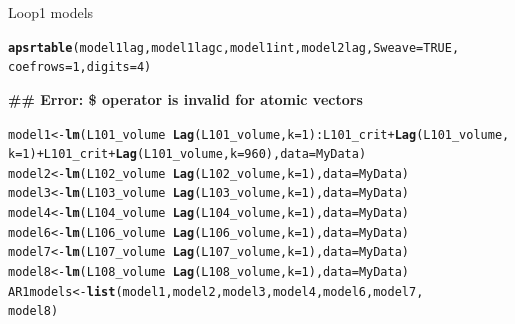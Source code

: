 \documentclass[review, authoryear]{elsarticle}\usepackage{graphicx, color}
\makeatletter
\newcommand{\hlfunctioncall}[1]{\textcolor[rgb]{0.501960784313725,0,0.329411764705882}{\textbf{#1}}}%
\newenvironment{kframe}{%
 \def\at@end@of@kframe{}%
 \ifinner\ifhmode%
  \def\at@end@of@kframe{\end{minipage}}%
  \begin{minipage}{\columnwidth}%
 \fi\fi%
 \def\FrameCommand##1{\hskip\@totalleftmargin \hskip-\fboxsep
 \colorbox{shadecolor}{##1}\hskip-\fboxsep
     \hskip-\linewidth \hskip-\@totalleftmargin \hskip\columnwidth}%
 \MakeFramed {\advance\hsize-\width
   \@totalleftmargin\z@ \linewidth\hsize
   \@setminipage}}%
 {\par\unskip\endMakeFramed%
 \at@end@of@kframe}
\newenvironment{knitrout}{}{} %
\makeatother
\begin{document}
\begin{table}
  \caption{Loop1 models}
\begin{knitrout}
\color{fgcolor}\begin{kframe}
\begin{alltt}
\hlfunctioncall{apsrtable}(model1lag, model1lagc, model1int, model2lag, Sweave = TRUE, 
    coefrows = 1, digits = 4)
\end{alltt}


{\ttfamily\noindent\bfseries\textcolor{errorcolor}{\#\# Error: \$ operator is invalid for atomic vectors}}\end{kframe}
\end{knitrout}

\end{table}

\begin{knitrout}
\color{fgcolor}\begin{kframe}
\begin{alltt}
model1 <- \hlfunctioncall{lm}(L101_volume ~ \hlfunctioncall{Lag}(L101_volume, k = 1):L101_crit + \hlfunctioncall{Lag}(L101_volume, 
    k = 1) + L101_crit + \hlfunctioncall{Lag}(L101_volume, k = 960), data = MyData)
model2 <- \hlfunctioncall{lm}(L102_volume ~ \hlfunctioncall{Lag}(L102_volume, k = 1), data = MyData)
model3 <- \hlfunctioncall{lm}(L103_volume ~ \hlfunctioncall{Lag}(L103_volume, k = 1), data = MyData)
model4 <- \hlfunctioncall{lm}(L104_volume ~ \hlfunctioncall{Lag}(L104_volume, k = 1), data = MyData)
model6 <- \hlfunctioncall{lm}(L106_volume ~ \hlfunctioncall{Lag}(L106_volume, k = 1), data = MyData)
model7 <- \hlfunctioncall{lm}(L107_volume ~ \hlfunctioncall{Lag}(L107_volume, k = 1), data = MyData)
model8 <- \hlfunctioncall{lm}(L108_volume ~ \hlfunctioncall{Lag}(L108_volume, k = 1), data = MyData)
AR1models <- \hlfunctioncall{list}(model1, model2, model3, model4, model6, model7, 
    model8)
\end{alltt}
\end{kframe}
\end{knitrout}
\end{document}
